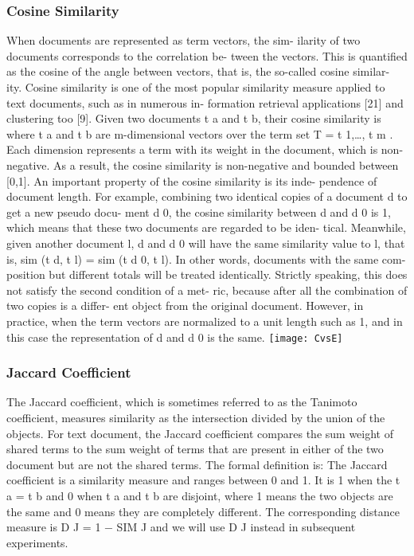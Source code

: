 \documentclass{VUMIFInfKursinis}
\begin{document}
		\subsubsection{Cosine Similarity}
			When documents are represented as term vectors, the sim- ilarity of two documents corresponds to the correlation be- tween the vectors. This is quantified as the cosine of the angle between vectors, that is, the so-called cosine similar- ity. Cosine similarity is one of the most popular similarity measure applied to text documents, such as in numerous in- formation retrieval applications [21] and clustering too [9].
			Given two documents t a and t b, their cosine similarity is
			where t a and t b are m-dimensional vectors over the term set T = {t 1,\ldots, t m }. Each dimension represents a term with its weight in the document, which is non-negative. As a result, the cosine similarity is non-negative and bounded between [0,1].
			An important property of the cosine similarity is its inde- pendence of document length. For example, combining two identical copies of a document d to get a new pseudo docu- ment d 0, the cosine similarity between d and d 0 is 1, which means that these two documents are regarded to be iden- tical. Meanwhile, given another document l, d and d 0 will have the same similarity value to l, that is, sim (t d, t l) = sim (t d 0, t l). In other words, documents with the same com- position but different totals will be treated identically. Strictly speaking, this does not satisfy the second condition of a met- ric, because after all the combination of two copies is a differ- ent object from the original document. However, in practice, when the term vectors are normalized to a unit length such as 1, and in this case the representation of d and d 0 is the same.
			\texttt{[image: CvsE]}

		\subsubsection{Jaccard Coefficient}
			The Jaccard coefficient, which is sometimes referred to as the Tanimoto coefficient, measures similarity as the intersection
			divided by the union of the objects. For text document, the Jaccard coefficient compares the sum weight of shared terms to the sum weight of terms that are present in either of the two document but are not the shared terms. The formal definition is:
			The Jaccard coefficient is a similarity measure and ranges between 0 and 1. It is 1 when the t a = t b and 0 when t a and t b are disjoint, where 1 means the two objects are the same and 0 means they are completely different. The corresponding distance measure is D J = 1 − SIM J and we will use D J instead in subsequent experiments.
\end{document}
